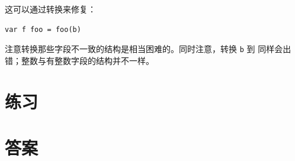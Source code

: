 \noindent{}

\noindent{}这可以通过转换来修复：
\begin{lstlisting}
var f foo = foo(b)
\end{lstlisting}
注意转换那些字段不一致的结构是相当困难的。同时注意，转换
\lstinline{b} 到  同样会出错；整数与有整数字段的结构并不一样。

\section{练习}










\cleardoublepage
\section{答案}
\shipoutAnswer
